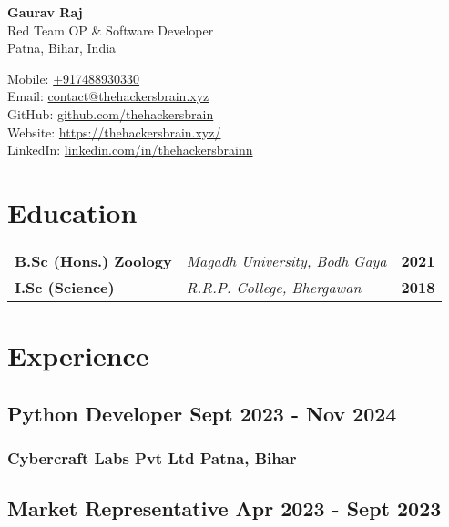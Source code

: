 \documentclass[11pt]{article} %
\begin{document}
\begin{center}
	\begin{minipage}{0.4\textwidth}
		{\Huge\bfseries
			Gaurav Raj %
		} \\ \medskip
		Red Team OP \& Software Developer \\ %
    Patna, Bihar, India
	\end{minipage} \hfill
	\begin{minipage}{0.5\textwidth}
		\raggedleft
		Mobile: \href{tel:+917488930330}{+917488930330} \\
		Email: \href{mailto:contact@thehackersbrain.xyz}{contact@thehackersbrain.xyz} \\
		GitHub: \href{https://github.com/thehackersbrain}{github.com/thehackersbrain} \\
		Website: \href{https://thehackersbrain.xyz/}{https://thehackersbrain.xyz/} \\
		LinkedIn: \href{https://www.linkedin.com/in/thehackersbrainn}{linkedin.com/in/thehackersbrainn}
	\end{minipage}
\end{center}


\section{Education}

\begin{tabular}{@{} p{} p{} r @{}}
    \textbf{B.Sc (Hons.) Zoology} & \textit{Magadh University, Bodh Gaya} & \textbf{2021} \\
    \textbf{I.Sc (Science)} & \textit{R.R.P. College, Bhergawan} & \textbf{2018} \\
\end{tabular}


\section{Experience}
\subsection{Python Developer \hfill Sept 2023 - Nov 2024}
\subsubsection{Cybercraft Labs Pvt Ltd \hfill Patna, Bihar}
\vspace{8pt}
\subsection{Market Representative \hfill Apr 2023 - Sept 2023}
\end{document}

